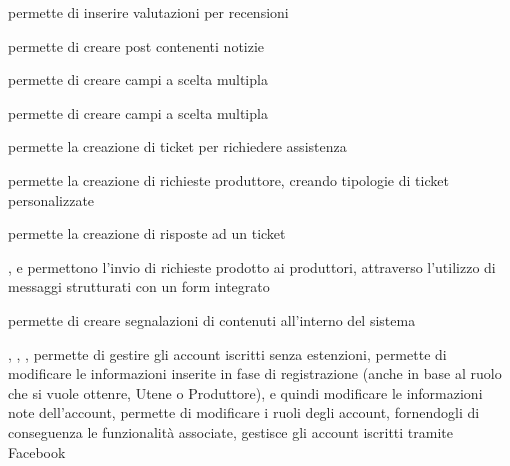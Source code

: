 
{}
{ permette di inserire valutazioni per recensioni}


{}
{ permette di creare post contenenti notizie}


{}
{ permette di creare campi a scelta multipla}


{}
{ permette di creare campi a scelta multipla}


{}
{ permette la creazione di ticket per richiedere assistenza}


{}
{ permette la creazione di richieste produttore, creando tipologie di ticket personalizzate}


{}
{ permette la creazione di risposte ad un ticket}


{, }
{ e  permettono l'invio di richieste prodotto ai produttori, attraverso l'utilizzo di messaggi strutturati con un form integrato}


{}
{ permette di creare segnalazioni di contenuti all'interno del sistema}


{, , , }
{ permette di gestire gli account iscritti senza estenzioni,  permette di modificare le informazioni inserite in fase di registrazione (anche in base al ruolo che si vuole ottenre, Utene o Produttore), e quindi modificare le informazioni note dell'account,  permette di modificare i ruoli degli account, fornendogli di conseguenza le funzionalità associate,  gestisce gli account iscritti tramite Facebook}

